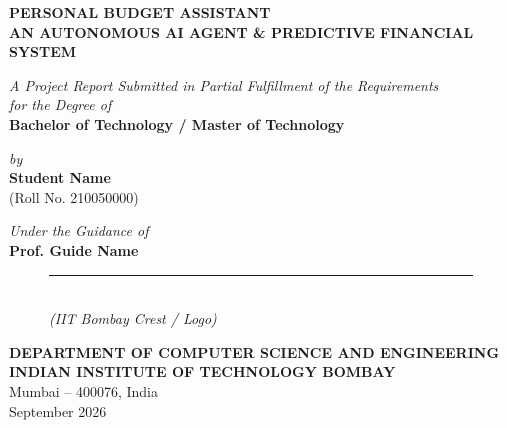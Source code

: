 \documentclass[12pt,a4paper,oneside]{report}
\begin{document}

\begin{titlepage}
    \begin{center}
        \vspace*{0.5cm}
        
        \Huge \textbf{PERSONAL BUDGET ASSISTANT} \\[0.4cm]
        \Large \textbf{AN AUTONOMOUS AI AGENT \& PREDICTIVE FINANCIAL SYSTEM}
        
        \vspace{1.5cm}
        
        \large \textit{A Project Report Submitted in Partial Fulfillment of the Requirements \\ for the Degree of} \\[0.3cm]
        \Large \textbf{Bachelor of Technology / Master of Technology}
        
        \vspace{1.2cm}
        
        \large \textit{by} \\[0.2cm]
        \Large \textbf{Student Name} \\
        \large (Roll No. 210050000)
        
        \vspace{1.2cm}
        
        \large \textit{Under the Guidance of} \\[0.2cm]
        \Large \textbf{Prof. Guide Name}
        
        \vspace{1.5cm}
        
        \begin{figure}[h!]
            \centering
            \rule{3cm}{3cm} \\
            \vspace{0.2cm}
            \small \textit{(IIT Bombay Crest / Logo)}
        \end{figure}
        
        \vspace{0.8cm}
        
        \Large \textbf{DEPARTMENT OF COMPUTER SCIENCE AND ENGINEERING} \\[0.2cm]
        \large \textbf{INDIAN INSTITUTE OF TECHNOLOGY BOMBAY} \\[0.2cm]
        \large Mumbai -- 400076, India \\[0.4cm]
        \large September 2026
    \end{center}
\end{titlepage}
\end{document}
